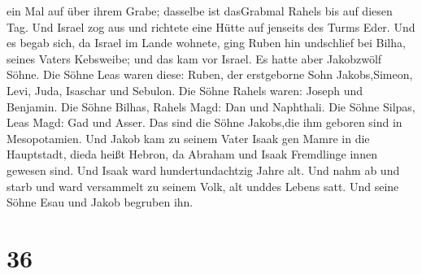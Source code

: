 ein Mal auf über ihrem Grabe; dasselbe ist dasGrabmal Rahels bis auf
diesen Tag.  Und Israel zog aus und richtete eine Hütte auf
jenseits des Turms Eder.  Und es begab sich, da Israel im
Lande wohnete, ging Ruben hin undschlief bei Bilha, seines Vaters
Kebsweibe; und das kam vor Israel. Es hatte aber Jakobzwölf Söhne.
 Die Söhne Leas waren diese: Ruben, der erstgeborne Sohn
Jakobs,Simeon, Levi, Juda, Isaschar und Sebulon.  Die Söhne
Rahels waren: Joseph und Benjamin.  Die Söhne Bilhas,
Rahels Magd: Dan und Naphthali.  Die Söhne Silpas, Leas
Magd: Gad und Asser. Das sind die Söhne Jakobs,die ihm geboren sind in
Mesopotamien.  Und Jakob kam zu seinem Vater Isaak gen
Mamre in die Hauptstadt, dieda heißt Hebron, da Abraham und Isaak
Fremdlinge innen gewesen sind.  Und Isaak ward
hundertundachtzig Jahre alt.  Und nahm ab und starb und
ward versammelt zu seinem Volk, alt unddes Lebens satt. Und seine Söhne
Esau und Jakob begruben ihn.

\hypertarget{section-35}{%
\section{36}\label{section-35}}

